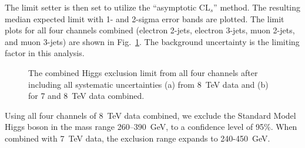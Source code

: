The limit setter is then set to utilize
the ``asymptotic CL$_{s}$''
\cite{cite:asympcls1,cite:asympcls2} method. 
The resulting median
expected limit with 1- and 2-sigma error bands are plotted.
The limit plots for all four channels combined (electron 2-jets, 
electron 3-jets, muon 2-jets, and muon 3-jets) are shown in
Fig.~\ref{fig:limitsetup:combinedlimit}. 
The background uncertainty is the limiting factor in this analysis.
\begin{figure}[htb] 
  \begin{center}
    \caption{The combined Higgs exclusion limit from all four channels
      after including all systematic uncertainties  (a) from 8~TeV data and (b) for 7 and 8~TeV data combined.}
    \label{fig:limitsetup:combinedlimit}
  \end{center}
\end{figure}

Using all four channels of 8~TeV data combined, we exclude the Standard Model 
Higgs boson in the mass range 260--390~GeV, to a confidence level
of 95\%.  When combined with 7~TeV data, the exclusion range expands to 240-450~GeV.
